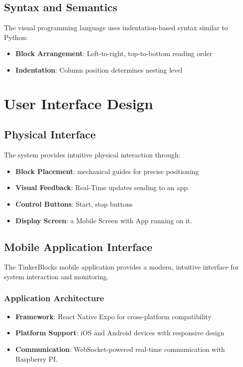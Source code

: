 \subsection{Syntax and Semantics}

The visual programming language uses indentation-based syntax similar to Python:

\begin{itemize}
    \item \textbf{Block Arrangement}: Left-to-right, top-to-bottom reading order
    \item \textbf{Indentation}: Column position determines nesting level

\end{itemize}



\section{User Interface Design}

\subsection{Physical Interface}

The system provides intuitive physical interaction through:

\begin{itemize}
    \item \textbf{Block Placement}: mechanical guides for precise positioning
    \item \textbf{Visual Feedback}: Real-Time updates sending to an app.
    \item \textbf{Control Buttons}: Start, stop buttons
    \item \textbf{Display Screen}: a Mobile Screen with App running on it.
\end{itemize}

\subsection{Mobile Application Interface}

The TinkerBlocks mobile application provides a modern, intuitive interface for system interaction and monitoring.

\subsubsection{Application Architecture}
\begin{itemize}
    \item \textbf{Framework}: React Native Expo for cross-platform compatibility
    \item \textbf{Platform Support}: iOS and Android devices with responsive design
    \item \textbf{Communication}: WebSocket-powered real-time communication with Raspberry PI.
\end{itemize}

